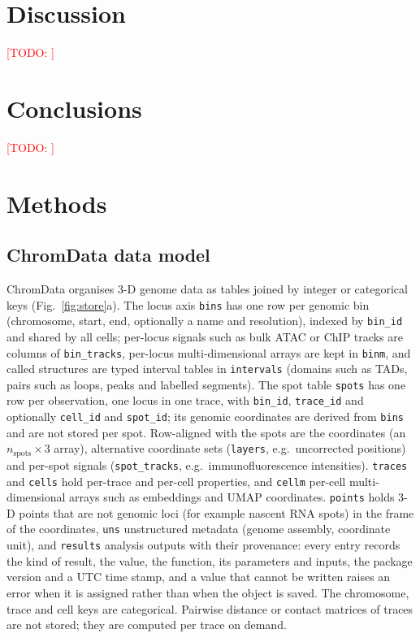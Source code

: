 \documentclass[11pt]{article}
\newcommand{\todo}[1]{\textcolor{red}{[TODO: #1]}}
\newcommand{\pkg}[1]{\texttt{#1}}
\begin{document}
\section*{Discussion}
\todo{}

\section*{Conclusions}
\todo{}

\section*{Methods}

\subsection*{ChromData data model}
ChromData organises 3-D genome data as tables joined by integer or categorical keys (Fig.~\ref{fig:store}a).
The locus axis \pkg{bins} has one row per genomic bin (chromosome, start, end, optionally a name and resolution), indexed by \pkg{bin\_id} and shared by all cells; per-locus signals such as bulk ATAC or ChIP tracks are columns of \pkg{bin\_tracks}, per-locus multi-dimensional arrays are kept in \pkg{binm}, and called structures are typed interval tables in \pkg{intervals} (domains such as TADs, pairs such as loops, peaks and labelled segments).
The spot table \pkg{spots} has one row per observation, one locus in one trace, with \pkg{bin\_id}, \pkg{trace\_id} and optionally \pkg{cell\_id} and \pkg{spot\_id}; its genomic coordinates are derived from \pkg{bins} and are not stored per spot.
Row-aligned with the spots are the coordinates (an $n_\mathrm{spots}\times 3$ array), alternative coordinate sets (\pkg{layers}, e.g.\ uncorrected positions) and per-spot signals (\pkg{spot\_tracks}, e.g.\ immunofluorescence intensities).
\pkg{traces} and \pkg{cells} hold per-trace and per-cell properties, and \pkg{cellm} per-cell multi-dimensional arrays such as embeddings and UMAP coordinates.
\pkg{points} holds 3-D points that are not genomic loci (for example nascent RNA spots) in the frame of the coordinates, \pkg{uns} unstructured metadata (genome assembly, coordinate unit), and \pkg{results} analysis outputs with their provenance: every entry records the kind of result, the value, the function, its parameters and inputs, the package version and a UTC time stamp, and a value that cannot be written raises an error when it is assigned rather than when the object is saved.
The chromosome, trace and cell keys are categorical.
Pairwise distance or contact matrices of traces are not stored; they are computed per trace on demand.
\end{document}
